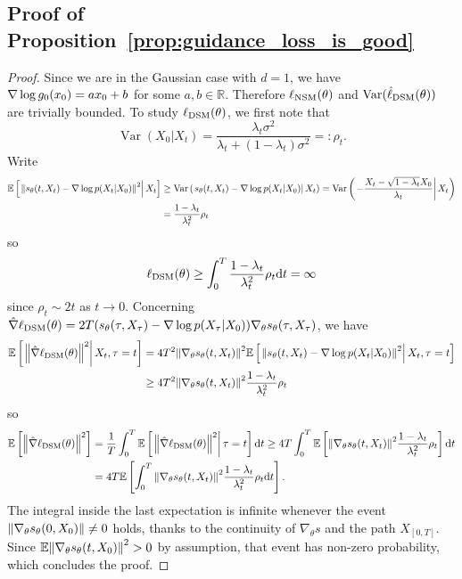 \documentclass{article}
\theoremstyle{plain}
\theoremstyle{definition}
\theoremstyle{remark}
\begin{document}
\newcommand{\ceh}[1]{\CE{#1}{X_t}}
\newcommand{\cehbis}[1]{\CE{#1}{X_t, \tau=t}}
\newcommand{\veh}[1]{\VarE{#1}{X_t}}
\subsection{Proof of Proposition~\ref{prop:guidance_loss_is_good}}
\begin{proof}
	Since we are in the Gaussian case with $d=1$, we have $\nabla\log g_0(x_0) = ax_0 + b$ for some $a,b\in \mathbb R$. Therefore $\ell_{\textup{NSM}}(\theta)$ and $\operatorname{Var}(\hat \ell_{\textup{DSM}}(\theta))$ are trivially bounded. To study $\ell_{\textup{DSM}}(\theta)$, we first note that
	\begin{equation*}
		\operatorname{Var}(X_0|X_t) = \frac{\lambda_t \sigma^2}{\lambda_t + (1-\lambda_t) \sigma^2} =: \rho_t.
	\end{equation*}
	Write
	\begin{equation*}
		\begin{split}
			\ceh{\norm{s_\theta(t, X_t) - \gradlog p(X_t|X_0)}^2} &\geq \veh{s_\theta(t, X_t) - \gradlog p(X_t|X_0)} = \veh{-\frac{X_t-\sqrt{1-\lambda_t} X_0}{\lambda_t}} \\
			&= \frac{1-\lambda_t}{\lambda_t^2} \rho_t
		\end{split}
	\end{equation*}
	so
	\begin{equation*}
		\ell_{\textup{DSM}}(\theta) \geq \int_0^T \frac{1-\lambda_t}{\lambda_t^2} \rho_t \dd t = \infty
	\end{equation*}
	since $\rho_t \sim 2t$ as $ t \to 0$.
	Concerning $\hat \nabla \ell_{\textup{DSM}}(\theta) = 2T(s_\theta(\tau, X_\tau) - \nabla\log p(X_\tau|X_0))\nabla_\theta s_\theta(\tau, X_\tau)$, we have
	\begin{equation*}
		\begin{split}
			\cehbis{\norm{\hat \nabla \ell_{\textup{DSM}}(\theta)}^2} &= 4T^2\norm{\nabla_\theta s_\theta(t, X_t)}^2 \cehbis{\norm{s_\theta(t, X_t) - \gradlog p(X_t|X_0)}^2} \\
			&\geq 4T^2\norm{\nabla_\theta s_\theta(t, X_t)}^2 \frac{1-\lambda_t}{\lambda_t^2} \rho_t
		\end{split}
	\end{equation*}
	so
	\begin{equation*}
		\begin{split}
			\mathbb{E}\left[ \norm{\hat \nabla \ell_{\textup{DSM}}(\theta)}^2 \right] &= \frac 1T \int_0^T \mathbb{E}\left[ \left. {\norm{\hat \nabla \ell_{\textup{DSM}}(\theta)}^2} \right \vert {\tau=t} \right] \dd t \geq 4T \int_0^T \mathbb{E}\left[ \norm{\nabla_\theta s_\theta(t, X_t)}^2 \frac{1-\lambda_t}{\lambda_t^2} \rho_t \right] \dd t \\
			&= 4T \mathbb{E}\left[ \int_0^T \norm{\nabla_\theta s_\theta(t, X_t)}^2 \frac{1-\lambda_t}{\lambda_t^2} \rho_t \dd t \right].
		\end{split}
	\end{equation*}
	The integral inside the last expectation is infinite whenever the event $\norm{\nabla_\theta s_\theta(0, X_0)} \neq 0$ holds, thanks to the continuity of $\nabla_\theta s$ and the path $X_{[0,T]}$. Since $\mathbb{E}\norm{\nabla_\theta s_\theta(t, X_0)}^2 > 0$ by assumption, that event has non-zero probability, which concludes the proof.
\end{proof}
\end{document}
